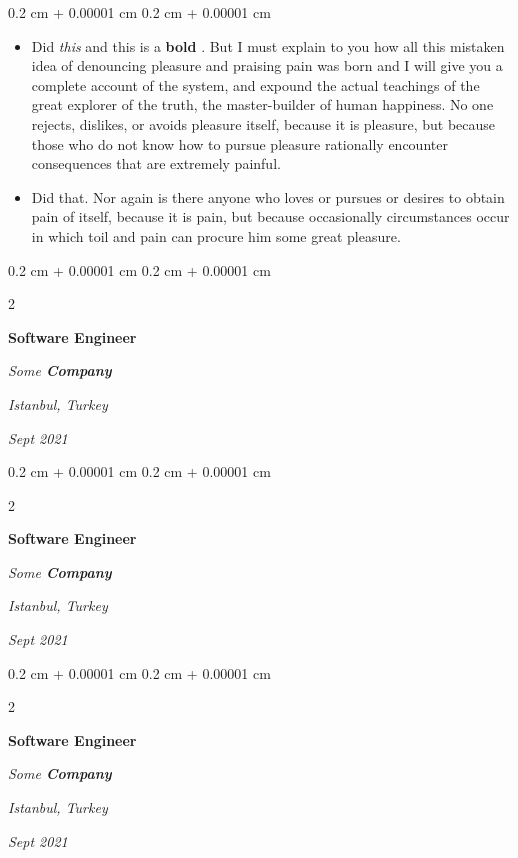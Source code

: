 \documentclass[10pt, letterpaper]{article}
\newenvironment{highlights}{
    \begin{itemize}[
        topsep=0.10 cm,
        parsep=0.10 cm,
        partopsep=0pt,
        itemsep=0pt,
        leftmargin=0.4 cm + 10pt
    ]
}{
    \end{itemize}
} %
\newenvironment{onecolentry}{
    \begin{adjustwidth}{
        0.2 cm + 0.00001 cm
    }{
        0.2 cm + 0.00001 cm
    }
}{
    \end{adjustwidth}
} %
\newenvironment{twocolentry}[2][]{
    \onecolentry
    \def\secondColumn{#2}
    \setcolumnwidth{\fill, 4.5 cm}
    \begin{paracol}{2}
}{
    \switchcolumn \raggedleft \secondColumn
    \end{paracol}
    \endonecolentry
} %
\let\hrefWithoutArrow\href
\renewcommand{\href}[2]{\hrefWithoutArrow{#1}{\ifthenelse{\equal{#2}{}}{ }{#2 }\raisebox{.15ex}{\footnotesize \faExternalLink*}}}
\begin{document}
        \vspace{0.10 cm}
        \begin{onecolentry}
            \begin{highlights}
                \item Did \textit{this} and this is a \textbf{bold} \href{https://example.com}{link}. But I must explain to you how all this mistaken idea of denouncing pleasure and praising pain was born and I will give you a complete account of the system, and expound the actual teachings of the great explorer of the truth, the master-builder of human happiness. No one rejects, dislikes, or avoids pleasure itself, because it is pleasure, but because those who do not know how to pursue pleasure rationally encounter consequences that are extremely painful.
                \item Did that. Nor again is there anyone who loves or pursues or desires to obtain pain of itself, because it is pain, but because occasionally circumstances occur in which toil and pain can procure him some great pleasure.
            \end{highlights}
        \end{onecolentry}


        \vspace{0.2 cm}

        \begin{twocolentry}{
        \textit{Istanbul, Turkey}    
            
        \textit{Sept 2021}}
            \textbf{Software Engineer}
            
            \textit{Some \textbf{Company}}
        \end{twocolentry}



        \vspace{0.2 cm}

        \begin{twocolentry}{
        \textit{Istanbul, Turkey}    
            
        \textit{Sept 2021}}
            \textbf{Software Engineer}
            
            \textit{Some \textbf{Company}}
        \end{twocolentry}



        \vspace{0.2 cm}

        \begin{twocolentry}{
        \textit{Istanbul, Turkey}    
            
        \textit{Sept 2021}}
            \textbf{Software Engineer}
            
            \textit{Some \textbf{Company}}
        \end{twocolentry}
\end{document}
